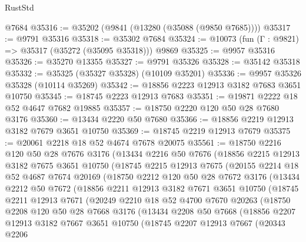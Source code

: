 \begin{lexlean}{RustStd}
\begin{coremodule}
    @7684
@35316 := @35202 (@9841 (@13280 (@35088 (@9850 @7685))))
@35317 := @9791 @35316
@35318 := @35302 @7684
@35324 := @10073 (fun (Γ : @9821) => @35317 (@35272 (@35095 @35318))) @9869
@35325 := @9957 @35316
@35326 := @35270 @13355
@35327 := @9791 @35326
@35328 := @35142 @35318
@35332 := @35325 (@35327 @35328) (@10109 @35201)
@35336 := @9957 @35326 @35328 (@10114 @35269)
@35342 := @18856 @2223 @12913 @3182 @7683 @3651 @10750
@35345 := @18745 @2223 @12913 @7683
@35351 := @19871 @2222 @18 @52 @4647 @7682 @19885
@35357 := @18750 @2220 @120 @50 @28 @7680 @3176
@35360 := @13434 @2220 @50 @7680
@35366 := @18856 @2219 @12913 @3182 @7679 @3651 @10750
@35369 := @18745 @2219 @12913 @7679
@35375 := @20061 @2218 @18 @52 @4674 @7678 @20075
@35561 := @18750
    @2216
    @120
    @50
    @28
    @7676
    @3176
    (@13434
      @2216
      @50
      @7676
      (@18856
        @2215
        @12913
        @3182
        @7675
        @3651
        @10750
        (@18745
          @2215
          @12913
          @7675
          (@20155
            @2214
            @18
            @52
            @4687
            @7674
            @20169
            (@18750
              @2212
              @120
              @50
              @28
              @7672
              @3176
              (@13434
                @2212
                @50
                @7672
                (@18856
                  @2211
                  @12913
                  @3182
                  @7671
                  @3651
                  @10750
                  (@18745
                    @2211
                    @12913
                    @7671
                    (@20249
                      @2210
                      @18
                      @52
                      @4700
                      @7670
                      @20263
                      (@18750
                        @2208
                        @120
                        @50
                        @28
                        @7668
                        @3176
                        (@13434
                          @2208
                          @50
                          @7668
                          (@18856
                            @2207
                            @12913
                            @3182
                            @7667
                            @3651
                            @10750
                            (@18745
                              @2207
                              @12913
                              @7667
                              (@20343
                                @2206

\end{coremodule}
\end{lexlean}

